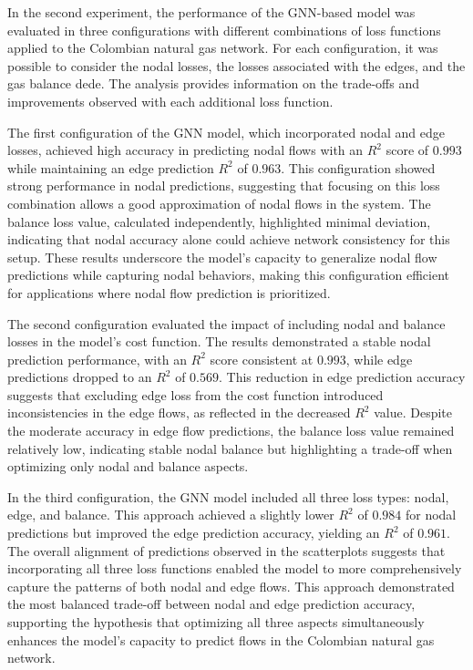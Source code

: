 In the second experiment, the performance of the GNN-based model was evaluated in three configurations with different combinations of loss functions applied to the Colombian natural gas network. For each configuration, it was possible to consider the nodal losses, the losses associated with the edges, and the gas balance dede. The analysis provides information on the trade-offs and improvements observed with each additional loss function.

The first configuration of the GNN model, which incorporated nodal and edge losses, achieved high accuracy in predicting nodal flows with an $R^2$ score of $0.993$ while maintaining an edge prediction $R^2$ of $0.963$. This configuration showed strong performance in nodal predictions,  suggesting that focusing on this loss combination allows a good approximation of nodal flows in the system. The balance loss value, calculated independently, highlighted minimal deviation, indicating that nodal accuracy alone could achieve network consistency for this setup. These results underscore the model's capacity to generalize nodal flow predictions while capturing nodal behaviors, making this configuration efficient for applications where nodal flow prediction is prioritized.

The second configuration evaluated the impact of including nodal and balance losses in the model's cost function. The results demonstrated a stable nodal prediction performance, with an $R^2$ score consistent at $0.993$, while edge predictions dropped to an $R^2$ of $0.569$. This reduction in edge prediction accuracy suggests that excluding edge loss from the cost function introduced inconsistencies in the edge flows, as reflected in the decreased $R^2$ value. Despite the moderate accuracy in edge flow predictions, the balance loss value remained relatively low, indicating stable nodal balance but highlighting a trade-off when optimizing only nodal and balance aspects. 


In the third configuration, the GNN model included all three loss types: nodal, edge, and balance. This approach achieved a slightly lower $R^2$ of $0.984$ for nodal predictions but improved the edge prediction accuracy, yielding an $R^2$ of $0.961$. The overall alignment of predictions observed in the scatterplots suggests that incorporating all three loss functions enabled the model to more comprehensively capture the patterns of both nodal and edge flows. This approach demonstrated the most balanced trade-off between nodal and edge prediction accuracy, supporting the hypothesis that optimizing all three aspects simultaneously enhances the model's capacity to predict flows in the Colombian natural gas network. 


